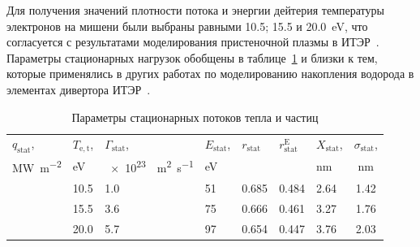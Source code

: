 Для получения значений плотности потока и энергии дейтерия температуры электронов на мишени были выбраны равными \num{10.5}; \num{15.5} и \SI{20.0}{\electronvolt}, что согласуется с результатами моделирования пристеночной плазмы в ИТЭР~\cite{Pitts2019, Orrico2023}. Параметры стационарных нагрузок обобщены в таблице~\ref{tab:stat_exposure} и близки к тем, которые применялись в других работах по моделированию накопления водорода в элементах дивертора ИТЭР~\cite{Delaporte-Mathurin2019, Delaporte-Mathurin2021_3, Delaporte-Mathurin2020, Delaporte-Mathurin2023, Hodille2021_2}.
\begin{table}[ht]
	\centering
	\caption{Параметры стационарных потоков тепла и частиц} \label{tab:stat_exposure}
	\begin{threeparttable}
		\renewcommand{\arraystretch}{1.2}%
		\begin{tabularx}{\linewidth}{>{\centering\arraybackslash}X>{\centering\arraybackslash}X>{\centering\arraybackslash}X>{\centering\arraybackslash}X>{\centering\arraybackslash}X>{\centering\arraybackslash}X>{\centering\arraybackslash}Xc}
			\toprule
			$q_{\mathrm{stat}}$,
			   & $T_{\mathrm{e,t}}$,
			   & $\Gamma_{\mathrm{stat}}$,
			   & $E_{\mathrm{stat}}$,
			   & $r_{\mathrm{stat}}$
			   & $r_{\mathrm{stat}}^{\mathrm{E}}$
			   & $X_{\mathrm{stat}}$,
			   & $\sigma_{\mathrm{stat}}$,                                                                                            \\
			\si{\mega\watt\per\meter\squared}
			   & \si{\electronvolt}
			   & \SI{e23}{\per\meter\squared\per\second}
			   & \si{\electronvolt}
			   &
			   &
			   & \si{\nano\meter}
			   & \si{\nano\meter}                                                                                                     \\
			\hline
			\hline
			1  & \num{10.5}                              & \num{1.0} & \num{51} & \num{0.685} & \num{0.484} & \num{2.64} & \num{1.42} \\
			5  & \num{15.5}                              & \num{3.6} & \num{75} & \num{0.666} & \num{0.461} & \num{3.27} & \num{1.76} \\
			10 & \num{20.0}                              & \num{5.7} & \num{97} & \num{0.654} & \num{0.447} & \num{3.76} & \num{2.03} \\
			\bottomrule
		\end{tabularx}
	\end{threeparttable}
\end{table}

